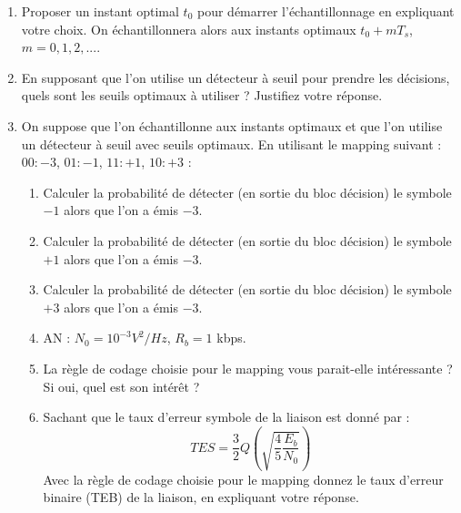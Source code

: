 \documentclass{article}
\begin{document}
    \begin{enumerate}
        \item Proposer un instant optimal $t_0$ pour démarrer l'échantillonnage en expliquant votre choix. On échantillonnera alors aux instants optimaux $t_0+mT_s$, $m=0, 1, 2, ...$.
        \item En supposant que l'on utilise un détecteur à seuil pour prendre les décisions, quels sont les seuils optimaux à utiliser ? Justifiez votre réponse.
        \item On suppose que l'on échantillonne aux instants optimaux et que l'on utilise un détecteur à seuil avec seuils optimaux. En utilisant le mapping suivant : $00: -3$,  $01: -1$, $11: +1$,  $10: +3$ :
                \begin{enumerate}
                    \item Calculer la probabilité de détecter (en sortie du bloc décision) le symbole $-1$ alors que l'on a émis $-3$.
                    \item Calculer la probabilité de détecter (en sortie du bloc décision) le symbole $+1$ alors que l'on a émis $-3$.
                    \item Calculer la probabilité de détecter (en sortie du bloc décision) le symbole $+3$ alors que l'on a émis $-3$.
                    \item AN : $N_0=10^{-3} V^2/Hz$, $R_b=1$ kbps.
                    \item La règle de codage choisie pour le mapping vous parait-elle intéressante ? Si oui, quel est son intérêt ?
                    \item Sachant que le taux d'erreur symbole de la liaison est donné par :
                    $$
                    TES= \frac{3}{2}Q\left(\sqrt{\frac{4}{5}\frac{E_b}{N_0}}\right)
                    $$
                    Avec la règle de codage choisie pour le mapping donnez le taux d'erreur binaire (TEB) de la liaison, en expliquant votre réponse.
                \end{enumerate}
    \end{enumerate}
\end{document}
